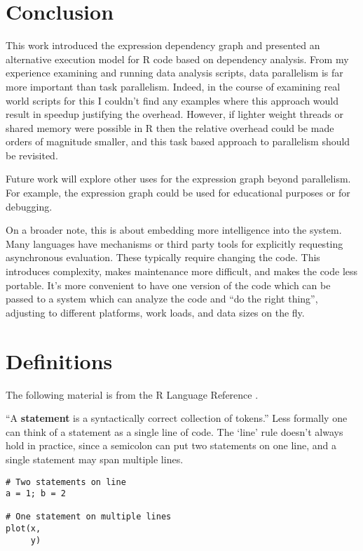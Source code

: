 \documentclass[12pt]{article}
\begin{document}
\section{Conclusion}

This work introduced the expression dependency graph and presented an
alternative execution model for R code based on dependency analysis.
From my experience examining and running data analysis scripts, 
data parallelism is far more important than task parallelism. Indeed, in
the course of examining real world scripts for this I couldn't find any
examples where this approach would result in speedup justifying the
overhead.  However, if lighter weight threads or shared memory were
possible in R then the relative overhead could be made orders of magnitude
smaller, and this task based approach to parallelism should be revisited.

Future work will explore other uses for the expression graph beyond
parallelism. For example, the expression graph could be used for
educational purposes or for debugging.

On a broader note, this is about embedding more intelligence into the 
system. Many languages have mechanisms or third party tools for explicitly
requesting asynchronous evaluation. These typically require changing the
code. This introduces complexity, makes maintenance more difficult, and
makes the code less portable.  It's more convenient to have one version of
the code which can be passed to a system which can analyze the code and
``do the right thing'', adjusting to different platforms, work loads, and
data sizes on the fly. 

\newpage
\appendix

\section{Definitions}

The following material is from the R Language Reference \cite{Rlang}.

``A \textbf{statement} is a
syntactically correct collection of tokens.'' Less formally one can think of
a statement as a single line of code. The `line' rule doesn't always hold in practice,
since a semicolon can put two statements on one line, and a single
statement may span multiple lines.

\begin{verbatim}
# Two statements on line
a = 1; b = 2

# One statement on multiple lines
plot(x,
     y)
\end{verbatim}
\end{document}
